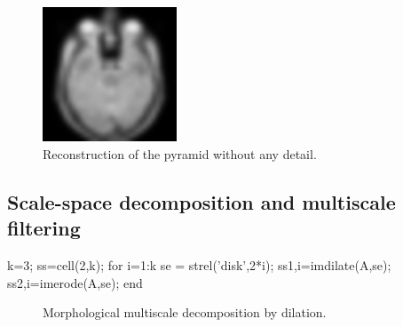 \begin{figure}[htbp]
\centering
 \includegraphics[width=4cm]{nodetails.png}
 \caption{Reconstruction of the pyramid without any detail.}
 \label{fig:multiscale:matlab:nodetails}
\end{figure}


\subsection{Scale-space decomposition and multiscale filtering}
\begin{matlab}
k=3; %
ss=cell(2,k);
for i=1:k
    se = strel('disk',2*i); %
    ss{1,i}=imdilate(A,se); %
    ss{2,i}=imerode(A,se);  %
end
\end{matlab}


\begin{figure}[htbp]
\centering
 \hfill
 \hfill
 \caption{Morphological multiscale decomposition by dilation.}
 \label{fig:multiscale:matlab:dilation}
\end{figure}

